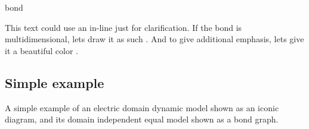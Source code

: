         \begin{docCommand}{bond}{}
            
\begin{dispExample}
This text could use an in-line  just for clarification.
If the bond is multidimensional, lets draw it as such . And to give additional emphasis, lets give it a beautiful color
.
\end{dispExample}
        \end{docCommand}
		
	\subsection{Simple example}
		A simple example of an electric domain dynamic model shown as an iconic diagram, and its domain independent equal model shown as a bond graph.
